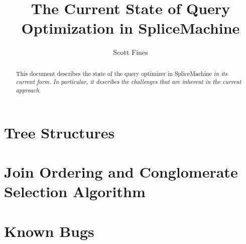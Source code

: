 \documentclass[10pt]{amsart}
\begin{document}
\title{The Current State of Query Optimization in SpliceMachine}
\author{Scott Fines}

\begin{abstract}
				This document describes the state of the query optimizer in SpliceMachine \em{in its current form}. In particular, it describes the challenges that are inherent in the current approach.
\end{abstract}

\maketitle

\section{Tree Structures}

\section{Join Ordering and Conglomerate Selection Algorithm}

\section{Known Bugs}
\end{document}
